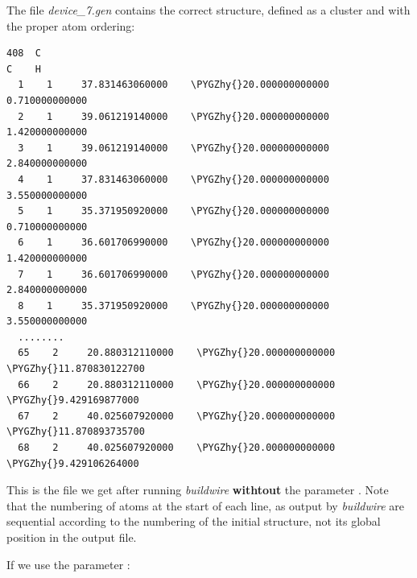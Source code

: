 \documentclass[a4paper,11pt,english]{sphinxmanual}
\def\PYGZhy{\char`\-}
\begin{document}
{{The file \emph{device\_7.gen} contains the correct structure, defined as
a cluster and with the proper atom ordering:
%
\begin{Verbatim}[commandchars=\\\{\}]
408  C
C    H
  1    1     37.831463060000    \PYGZhy{}20.000000000000      0.710000000000
  2    1     39.061219140000    \PYGZhy{}20.000000000000      1.420000000000
  3    1     39.061219140000    \PYGZhy{}20.000000000000      2.840000000000
  4    1     37.831463060000    \PYGZhy{}20.000000000000      3.550000000000
  5    1     35.371950920000    \PYGZhy{}20.000000000000      0.710000000000
  6    1     36.601706990000    \PYGZhy{}20.000000000000      1.420000000000
  7    1     36.601706990000    \PYGZhy{}20.000000000000      2.840000000000
  8    1     35.371950920000    \PYGZhy{}20.000000000000      3.550000000000
  ........
  65    2     20.880312110000    \PYGZhy{}20.000000000000    \PYGZhy{}11.870830122700
  66    2     20.880312110000    \PYGZhy{}20.000000000000     \PYGZhy{}9.429169877000
  67    2     40.025607920000    \PYGZhy{}20.000000000000    \PYGZhy{}11.870893735700
  68    2     40.025607920000    \PYGZhy{}20.000000000000     \PYGZhy{}9.429106264000
\end{Verbatim}

This is the file we get after running \emph{buildwire} {\bf withtout} the parameter .
Note that the numbering of atoms at the start of each line, as output
by \emph{buildwire} are sequential according to the numbering of the
initial structure, not its global position in the output file.

If we use the parameter :

}}
\end{document}
